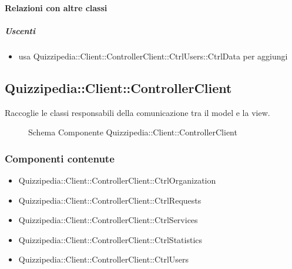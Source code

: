 \paragraph{Relazioni con altre classi}
\subparagraph{Uscenti}
\begin{itemize}
\item usa Quizzipedia::Client::ControllerClient::CtrlUsers::CtrlData per aggiungi
\end{itemize}
\subsection{Quizzipedia::Client::ControllerClient}
Raccoglie le classi responsabili della comunicazione tra il model e la view.
\begin{figure}[H]
\centering
\noindent{}
\caption[Schema Componente Quizzipedia::Client::ControllerClient]{Schema Componente Quizzipedia::Client::ControllerClient}
\end{figure}
\subsubsection{Componenti contenute}
\begin{itemize}
\item Quizzipedia::Client::ControllerClient::CtrlOrganization
\item Quizzipedia::Client::ControllerClient::CtrlRequests
\item Quizzipedia::Client::ControllerClient::CtrlServices
\item Quizzipedia::Client::ControllerClient::CtrlStatistics
\item Quizzipedia::Client::ControllerClient::CtrlUsers
\end{itemize}
